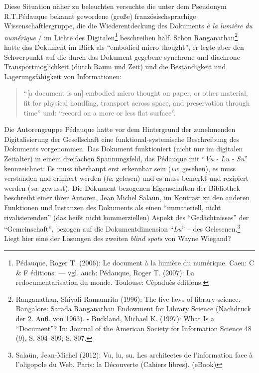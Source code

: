 Diese Situation näher zu beleuchten versuchte die unter dem Pseudonym
R.T.Pédauque bekannt gewordene (große) französischsprachige
Wissenschaftlergruppe, die die Wiederentdeckung des Dokuments \emph{à la
lumière du numérique} / im Lichte des Digitalen\footnote{Pédauque, Roger
  T. (2006): Le document à la lumière du numérique. Caen: C \& F
  éditions. --- vgl. auch: Pédauque, Roger T. (2007): La
  redocumentarisation du monde. Toulouse: Cépaduès éditions.}
beschreiben half. Schon Ranganathan\footnote{Ranganathan, Shiyali
  Ramamrita (1996): The five laws of library science. Bangalore: Sarada
  Ranganathan Endowment for Library Science (Nachdruck der 2. Aufl. von
  1963). - Buckland, Michael K. (1997): What Is a \enquote{Document}?
  In: Journal of the American Society for Information Science 48 (9), S.
  804--809; S. 807.} hatte das Dokument im Blick als \enquote{embodied
micro thought}, er legte aber den Schwerpunkt auf die durch das Dokument
gegebene synchrone und diachrone Transportmöglichkeit (durch Raum und
Zeit) und die Beständigkeit und Lagerungsfähigkeit von Informationen:

\begin{flushleft}
\begin{quote}
\enquote{{[}a document is an{]} embodied micro thought on paper, or
other material, fit for physical handling, transport across space, and
preservation through time} und: \enquote{record on a more or less flat
surface}.
\end{quote}
\end{flushleft}

Die Autorengruppe Pédauque hatte vor dem Hintergrund der zunehmenden
Digitalisierung der Gesellschaft eine funktional-systemische
Beschreibung des Dokuments vorgenommen. Das Dokument funktioniert (nicht
nur im digitalen Zeitalter) in einem dreifachen Spannungsfeld, das
Pédauque mit \enquote{\emph{Vu - Lu - Su}} kennzeichnet: Es muss
überhaupt erst erkennbar sein (\emph{vu}: gesehen), es muss verstanden
und erinnert werden (\emph{lu}: gelesen) und es muss bemerkt und
rezipiert werden (\emph{su}: gewusst). Die Dokument bezogenen
Eigenschaften der Bibliothek beschreibt einer ihrer Autoren, Jean Michel
Salaün, im Kontrast zu den anderen Funktionen und Instanzen des
Dokuments als einen \enquote{immateriell, nicht rivalisierenden} (das
heißt nicht kommerziellen) Aspekt des \enquote{Gedächtnisses} der
\enquote{Gemeinschaft}, bezogen auf die Dokumentdimension
\enquote{\emph{Lu}} -- des Gelesenen.\footnote{Salaün, Jean-Michel
  (2012): Vu, lu, su. Les architectes de l'information face à
  l'oligopole du Web. Paris: la Découverte (Cahiers libres). (eBook)}
Liegt hier eine der Lösungen des zweiten \emph{blind spots} von Wayne
Wiegand?

